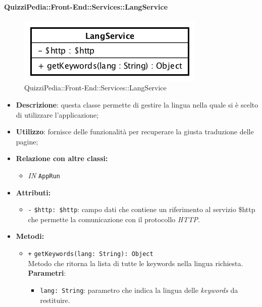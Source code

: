 \paragraph{QuizziPedia::Front-End::Services::LangService}
\begin{figure}[ht]
	\centering
	\includegraphics[scale=0.60]{UML/Classi/Front-End/QuizziPedia_Front-end_Services_LangService.png}
	\caption{QuizziPedia::Front-End::Services::LangService}
\end{figure}\FloatBarrier
\begin{itemize}
	\item \textbf{Descrizione}: questa classe permette di gestire la lingua nella quale si è scelto di utilizzare l'applicazione;
	\item \textbf{Utilizzo}: fornisce delle funzionalità per recuperare la giusta traduzione delle pagine;
	\item \textbf{Relazione con altre classi:}
	\begin{itemize}
		\item \textit{IN} \texttt{AppRun}
	\end{itemize}
	\item \textbf{Attributi:}
	\begin{itemize}
		\item \texttt{-} \texttt{\$http: \$http}: campo dati che contiene un riferimento al servizio \$http che permette la comunicazione con il protocollo \textit{HTTP}.
	\end{itemize}
	\item \textbf{Metodi:}
	\begin{itemize}
		\item \texttt{+} \texttt{getKeywords(lang: String): Object} \\Metodo che ritorna la lista di tutte le keywords nella lingua richiesta.\\
		\textbf{Parametri}:
		\begin{itemize}
			\item \texttt{lang: String}: parametro che indica la lingua delle \textit{keywords} da restituire.
		\end{itemize}
	\end{itemize}
\end{itemize}

